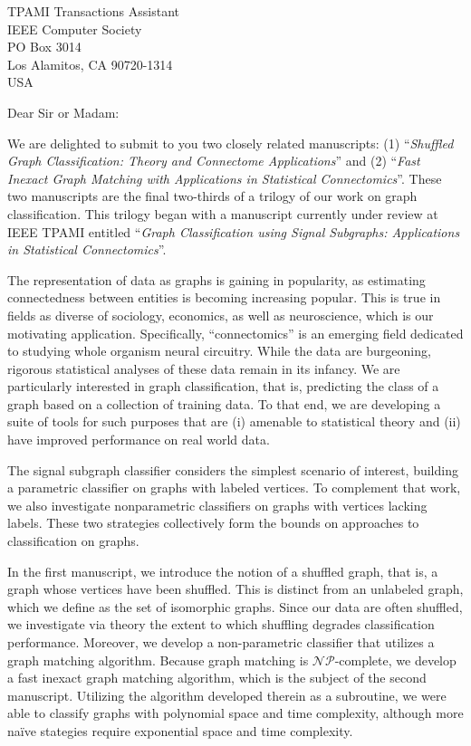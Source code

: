 \documentclass{letter}
\begin{document}
\begin{letter}{TPAMI Transactions Assistant \\ IEEE Computer Society \\ PO Box 3014 \\ Los Alamitos, CA  90720-1314\\ USA}
	
	 
	
	  
	
\opening{Dear Sir or Madam:}

We are delighted to submit to you two closely related manuscripts: (1) ``\emph{Shuffled Graph Classification: Theory and Connectome Applications}'' and  (2) ``\emph{Fast Inexact Graph Matching with Applications in Statistical Connectomics}''.  These two manuscripts are the final two-thirds of a trilogy of our work on graph classification.  This trilogy began with a manuscript currently under review at IEEE TPAMI entitled ``\emph{Graph Classification using Signal Subgraphs: Applications in Statistical Connectomics}''. 

The representation of data as graphs is gaining in popularity, as estimating connectedness between entities is becoming increasing popular.  This is true in fields as diverse of sociology, economics, as well as neuroscience, which is our motivating application.  Specifically, ``connectomics'' is an emerging field dedicated to studying whole organism neural circuitry.  While the data are burgeoning, rigorous statistical analyses of these data remain in its infancy. We are particularly interested in graph classification, that is, predicting the class of a graph based on a collection of training data.  To that end, we are developing a suite of tools for such purposes that are (i) amenable to statistical theory and (ii) have improved performance on real world data.


The signal subgraph classifier considers the simplest scenario of interest, building a parametric classifier on graphs with labeled vertices.  To complement that work, we also investigate nonparametric classifiers on graphs with vertices lacking labels. These two strategies collectively form the bounds on approaches to classification on graphs.  

In the first manuscript, we introduce the notion of a shuffled graph, that is, a graph whose vertices have been shuffled.  This is distinct from an unlabeled graph, which we define as the set of isomorphic graphs.  Since our data are often shuffled, we investigate via theory the extent to which shuffling degrades classification performance.  Moreover, we develop a non-parametric classifier that utilizes a graph matching algorithm.  Because graph matching is $\mathcal{NP}$-complete, we develop a fast inexact graph matching algorithm, which is the subject of the second manuscript.  Utilizing the algorithm developed therein as a subroutine, we were able to classify graphs with polynomial space and time complexity, although more na\"ive stategies require exponential space and time complexity.  


\end{letter}
\end{document}
